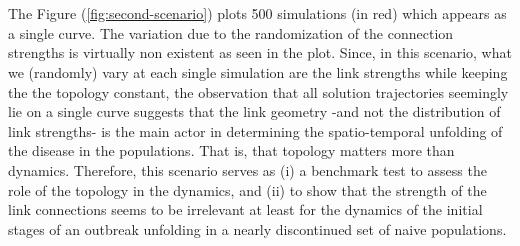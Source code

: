 \documentclass[10pt,a4paper]{article}
\begin{document}
\\\\
The Figure (\ref{fig:second-scenario}) plots 500 simulations (in red) which appears as a single curve. The variation due to the randomization of the connection strengths is virtually non existent as seen in the plot. 
%
Since, in this scenario, what we (randomly) vary at each single simulation are the link strengths while keeping the the topology constant, the observation that all solution trajectories seemingly lie on a single curve  suggests that the link geometry -and not the distribution of link strengths- is the main actor in determining the spatio-temporal unfolding of the disease in the populations. That is, that topology matters more than dynamics.  
%
Therefore, this scenario serves as (i) a benchmark test to assess the role of the topology in the dynamics, and (ii) to show that the strength of the link connections seems to be irrelevant at least for the dynamics of the initial stages of an outbreak unfolding in a nearly discontinued set of naive populations. 
%
%
%
\\\\
\end{document}
